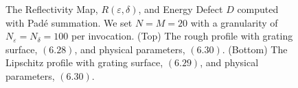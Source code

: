 \begin{figure}[H]
    \vspace{2mm}
    \caption{The Reflectivity Map, $R(\varepsilon,\delta)$, and Energy Defect $D$
    computed with Pad\'e summation. We set $N=M=20$ 
    with a granularity of $N_{\varepsilon}=N_{\delta}=100$ per invocation. (Top) The rough profile with grating surface, $(6.28)$, and physical parameters, $(6.30)$. (Bottom) The Lipschitz profile with grating surface, $(6.29)$, and physical parameters, $(6.30)$.}
    \label{Fig:RM:Single Case 2}
\end{figure}
